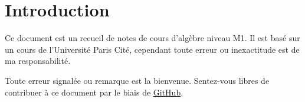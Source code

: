 \section{Introduction}

Ce document est un recueil de notes de cours d'algèbre niveau M1. Il est
basé sur un cours de l'Université Paris Cité, cependant toute
erreur ou inexactitude est de ma responsabilité.

Toute erreur signalée ou remarque est la bienvenue.
Sentez-vous libres de contribuer à ce document par le biais de \href{https://github.com/ThomArr/MIC-M1-S1-Algebre/}{GitHub}.

